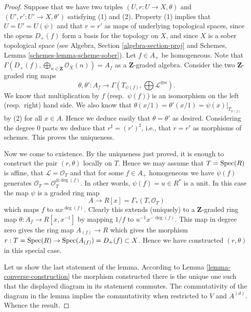 \begin{proof}
Suppose that we have two triples $(U, r : U \to X, \theta)$
and $(U', r' : U' \to X, \theta')$ satisfying (1) and (2).
Property (1) implies that $U = U' = U(\psi)$ and that
$r = r'$ as maps of underlying topological
spaces, since the opens $D_{+}(f)$ form a basis for the topology
on $X$, and since $X$ is a sober topological space (see
Algebra, Section \ref{algebra-section-proj}
and
Schemes, Lemma \ref{schemes-lemma-scheme-sober}).
Let $f \in A_{+}$ be homogeneous. Note that
$\Gamma(D_{+}(f), \bigoplus_{n \in \mathbf{Z}} \mathcal{O}_X(n)) = A_f$
as a $\mathbf{Z}$-graded algebra. Consider the two
$\mathbf{Z}$-graded ring maps
$$
\theta, \theta' :
A_f
\longrightarrow
\Gamma(T_{\psi(f)}, \bigoplus \mathcal{L}^{\otimes n}).
$$
We know that multiplication by $f$ (resp.\ $\psi(f)$)
is an isomorphism on the left (resp.\ right) hand side.
We also know that $\theta(x/1) = \theta'(x/1) = \psi(x)|_{T_{\psi(f)}}$
by (2) for all $x \in A$. Hence we deduce easily that $\theta = \theta'$
as desired. Considering the degree $0$ parts we deduce that
$r^\sharp = (r')^\sharp$, i.e., that $r = r'$ as morphisms of schemes.
This proves the uniqueness.

\medskip\noindent
Now we come to existence. By the uniqueness just proved, it is enough to
construct the pair $(r, \theta)$ locally on $T$. Hence we may assume
that $T = \mathop{\mathrm{Spec}}(R)$ is affine, that $\mathcal{L} = \mathcal{O}_T$
and that for some $f \in A_{+}$ homogeneous we have
$\psi(f)$ generates $\mathcal{O}_T = \mathcal{O}_T^{\otimes \deg(f)}$.
In other words, $\psi(f) = u \in R^*$ is a unit. In this case the map
$\psi$ is a graded ring map
$$
A \longrightarrow R[x] = \Gamma_*(T, \mathcal{O}_T)
$$
which maps $f$ to $ux^{\deg(f)}$. Clearly this extends (uniquely) to
a $\mathbf{Z}$-graded ring map $\theta : A_f \to R[x, x^{-1}]$ by
mapping $1/f$ to $u^{-1}x^{-\deg(f)}$. This map in degree zero gives
the ring map $A_{(f)} \to R$ which gives the morphism
$r : T = \mathop{\mathrm{Spec}}(R) \to \mathop{\mathrm{Spec}}(A_{(f)}) = D_{+}(f) \subset X$.
Hence we have constructed $(r, \theta)$ in this special case.

\medskip\noindent
Let us show the last statement of the lemma.
According to Lemma \ref{lemma-converse-construction}
the morphism constructed there is the unique one such that
the displayed diagram in its statement commutes.
The commutativity of the diagram in the lemma implies the
commutativity when restricted to $V$ and $A^{(d)}$.
Whence the result.
\end{proof}

